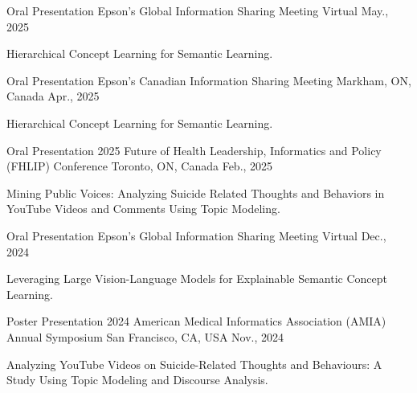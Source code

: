 
\vspace*{0.05cm}
\begin{cventries}
\cventry
{Oral Presentation} %
{Epson's Global Information Sharing Meeting} %
{Virtual} %
{May., 2025} %
{ %
\begin{cvitems}
\item {Hierarchical Concept Learning for Semantic Learning.}
\end{cvitems}
}
\cventry
{Oral Presentation} %
{Epson's Canadian Information Sharing Meeting} %
{Markham, ON, Canada} %
{Apr., 2025} %
{ %
\begin{cvitems}
\item {Hierarchical Concept Learning for Semantic Learning.}
\end{cvitems}
}
\cventry
{Oral Presentation} %
{2025 Future of Health Leadership, Informatics and Policy (FHLIP) Conference} %
{Toronto, ON, Canada} %
{Feb., 2025} %
{ %
\begin{cvitems}
\item {Mining Public Voices: Analyzing Suicide Related Thoughts and Behaviors in YouTube Videos and Comments Using Topic Modeling.}
\end{cvitems}
}
\cventry
{Oral Presentation} %
{Epson's Global Information Sharing Meeting} %
{Virtual} %
{Dec., 2024} %
{ %
\begin{cvitems}
\item {Leveraging Large Vision-Language Models for Explainable Semantic Concept Learning.}
\end{cvitems}
}
\cventry
{Poster Presentation} %
{2024 American Medical Informatics Association (AMIA) Annual Symposium} %
{San Francisco, CA, USA} %
{Nov., 2024} %
{ %
\begin{cvitems}
\item {Analyzing YouTube Videos on Suicide-Related Thoughts and Behaviours: A Study Using Topic Modeling and Discourse Analysis.}

\end{cvitems}}
\end{cventries}
